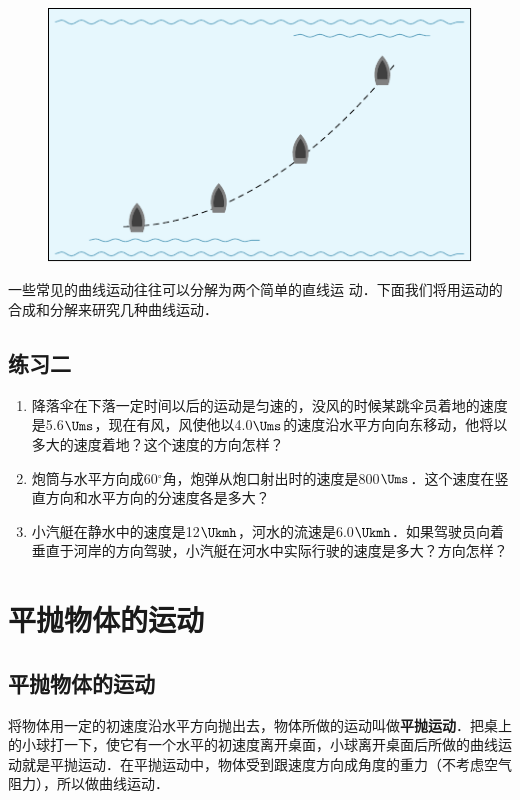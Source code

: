 \begin{figure}[htbp]
    \centering
    \includegraphics{fig/A/4-8.pdf}
    \caption{}\label{fig_A_4-8}
\end{figure}

一些常见的曲线运动往往可以分解为两个简单的直线运
动．下面我们将用运动的合成和分解来研究几种曲线运动．

\subsection*{练习二}
\begin{enumerate}
	\item 降落伞在下落一定时间以后的运动是匀速的，没风的时候某跳伞员着地的速度是5.6$\Ums$，现在有风，风使他以4.0$\Ums$的速度沿水平方向向东移动，他将以多大的速度着地？这个速度的方向怎样？
\item 炮筒与水平方向成60$^\circ$角，炮弹从炮口射出时的速度是800$\Ums$．这个速度在竖直方向和水平方向的分速度各是多大？
\item 小汽艇在静水中的速度是12$\Ukmh$，河水的流速是6.0$\Ukmh$．如果驾驶员向着垂直于河岸的方向驾驶，小汽艇在河水中实际行驶的速度是多大？方向怎样？
\end{enumerate}


\section{平抛物体的运动}
\subsection{平抛物体的运动} 

将物体用一定的初速度沿水平方向抛出去，物体所做的运动叫做\textbf{平抛运动}．把桌上的小球打一下，使它有一个水平的初速度离开桌面，小球离开桌面后所做的曲线运动就是平抛运动．在平抛运动中，物体受到跟速度方向成角度的重力（不考虑空气阻力），所以做曲线运动．

